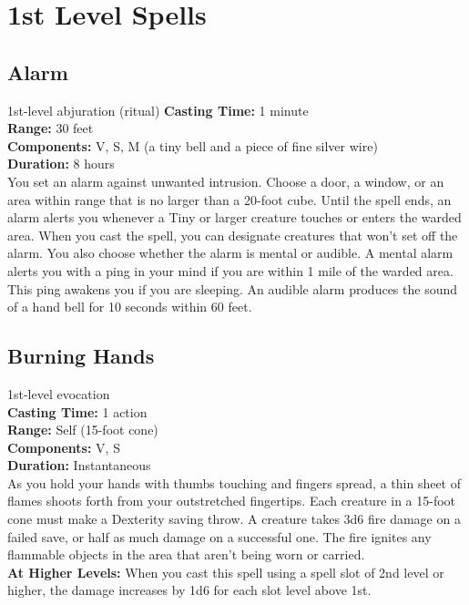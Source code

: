 \documentclass[11pt, A4paper, english]{article}
\begin{document}
	\section{1st Level Spells}
		\subsection{Alarm}
1st-level abjuration (ritual)
\textbf{Casting Time:} 1 minute \\
\textbf{Range:} 30 feet \\
\textbf{Components:} V, S, M (a tiny bell and a piece of fine silver wire) \\
\textbf{Duration:} 8 hours \\
You set an alarm against unwanted intrusion. Choose a door, a window, or an area within range that is no larger than a 20-foot cube. Until the spell ends, an alarm alerts you whenever a Tiny or larger creature touches or enters the warded area. When you cast the spell, you can designate creatures that won’t set off the alarm. You also choose whether the alarm is mental or audible. A mental alarm alerts you with a ping in your mind if you are within 1 mile of the warded area. This ping awakens you if you are sleeping. An audible alarm produces the sound of a hand bell for 10 seconds within 60 feet.

		\subsection{Burning Hands}
1st-level evocation \\
\textbf{Casting Time:} 1 action \\
\textbf{Range:} Self (15-foot cone) \\
\textbf{Components:} V, S \\
\textbf{Duration:} Instantaneous \\
As you hold your hands with thumbs touching and fingers spread, a thin sheet of flames shoots forth from your outstretched fingertips. Each creature in a 15-foot cone must make a Dexterity saving throw. A creature takes 3d6 fire damage on a failed save, or half as much damage on a successful one. The fire ignites any flammable objects in the area that aren’t being worn or carried. \\
\textbf{At Higher Levels:} When you cast this spell using a spell slot of 2nd level or higher, the damage increases by 1d6 for each slot level above  1st.
\end{document}

